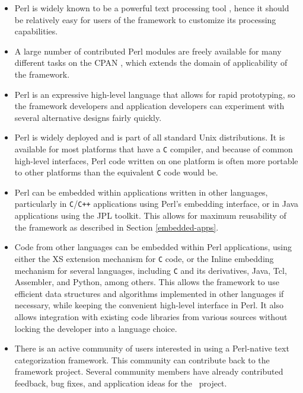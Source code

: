 \begin{itemize}
\item Perl is widely known to be a powerful text processing tool
   \cite{friedl:02, pedersen:01} \cite[p. 121]{manning:99}, hence it should be
   relatively easy for users of the framework to customize its
   processing capabilities.
\item A large number of contributed Perl modules are freely available
   for many different tasks on the CPAN \cite{cpan}, which extends the
   domain of applicability of the framework.
\item Perl is an expressive high-level language that allows for rapid
   prototyping, so the framework developers and application developers
   can experiment with several alternative designs fairly quickly.
\item Perl is widely deployed and is part of all standard Unix
   distributions.  It is available for most platforms that have a
   \texttt{C} compiler, and because of common high-level interfaces,
   Perl code written on one platform is often more portable to other
   platforms than the equivalent \texttt{C} code would be.
\item Perl can be embedded within applications written in other
   languages, particularly in \texttt{C}/\texttt{C++} applications
   using Perl's embedding interface, or in Java applications using the
   JPL toolkit.  This allows for maximum reusability of the
   framework as described in Section \ref{embedded-apps}.
\item Code from other languages can be embedded within Perl
   applications, using either the XS extension mechanism for
   \texttt{C} code, or the Inline embedding mechanism for several
   languages, including \texttt{C} and its derivatives, Java, Tcl,
   Assembler, and Python, among others.  This allows the framework to
   use efficient data structures and algorithms implemented in other
   languages if necessary, while keeping the convenient high-level
   interface in Perl.  It also allows integration with existing code
   libraries from various sources without locking the developer into a
   language choice.
\item There is an active community of users interested in using a
   Perl-native text categorization framework.  This community can
   contribute back to the framework project.  Several community
   members have already contributed feedback, bug fixes, and
   application ideas for the \aicat\ project.
\end{itemize}

